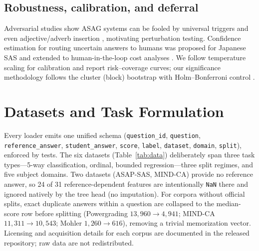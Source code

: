 \documentclass[11pt]{article}
\begin{document}
\subsection{Robustness, calibration, and deferral}
Adversarial studies show ASAG systems can be fooled by universal triggers and
even adjective/adverb insertion \cite{filighera2020fooling,filighera2023cheating,
ding2020dont}, motivating perturbation testing. Confidence estimation for
routing uncertain answers to humans was proposed for Japanese SAS
\cite{funayama2020preventing} and extended to human-in-the-loop cost analyses
\cite{funayama2022balancing}. We follow temperature scaling
\cite{guo2017calibration} for calibration and report risk--coverage curves;
our significance methodology follows the cluster (block) bootstrap
\cite{efron1993bootstrap} with Holm--Bonferroni control \cite{holm1979simple}.

\section{Datasets and Task Formulation}
\label{sec:data}

Every loader emits one unified schema
(\texttt{question\_id}, \texttt{question}, \texttt{reference\_answer},
\texttt{student\_answer}, \texttt{score}, \texttt{label}, \texttt{dataset},
\texttt{domain}, \texttt{split}), enforced by tests. The six datasets
(Table~\ref{tab:data}) deliberately span three task types---5-way
classification, ordinal, bounded regression---three split regimes, and five
subject domains. Two datasets (ASAP-SAS, MIND-CA) provide no reference answer,
so 24 of 31 reference-dependent features are intentionally \texttt{NaN} there
and ignored natively by the tree head (no imputation). For corpora without
official splits, exact duplicate answers within a question are collapsed to the
median-score row before splitting (Powergrading $13{,}960\!\rightarrow\!4{,}941$;
MIND-CA $11{,}311\!\rightarrow\!10{,}543$; Mohler $1{,}260\!\rightarrow\!616$),
removing a trivial memorization vector. Licensing and acquisition details for
each corpus are documented in the released repository; raw data are not
redistributed.
\end{document}
